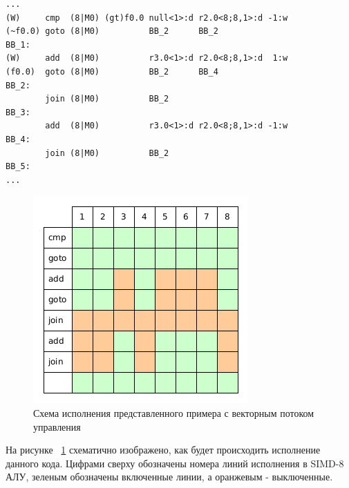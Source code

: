 \begin{verbatim}
...
(W)     cmp  (8|M0) (gt)f0.0 null<1>:d r2.0<8;8,1>:d -1:w
(~f0.0) goto (8|M0)          BB_2      BB_2
BB_1:
(W)     add  (8|M0)          r3.0<1>:d r2.0<8;8,1>:d  1:w
(f0.0)  goto (8|M0)          BB_2      BB_4
BB_2:
        join (8|M0)          BB_2
BB_3:
        add  (8|M0)          r3.0<1>:d r2.0<8;8,1>:d -1:w
BB_4:
        join (8|M0)          BB_2
BB_5:
...
\end{verbatim}

\begin{figure}[h]
  \centering
  \includegraphics[scale=0.60]{Images/HW-goto-example.png}
  \caption{Схема исполнения представленного примера с векторным потоком
  управления}
  \label{fig:HW-goto-example}
\end{figure}

На рисунке ~\ref{fig:HW-goto-example} схематично изображено, как будет
происходить исполнение данного кода. Цифрами сверху обозначены номера линий
исполнения в SIMD-8 АЛУ, зеленым обозначены включенные линии, а оранжевым -
выключенные.
